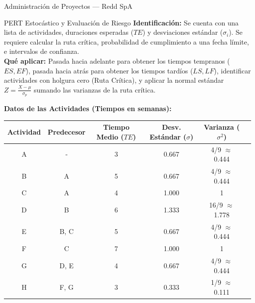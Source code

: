 \documentclass[11pt, a4paper]{article}
\begin{document}
\begin{ejercicio}{Administración de Proyectos --- Redd SpA}
  \begin{tipprueba}{PERT Estocástico y Evaluación de Riesgo}
    \textbf{Identificación:} Se cuenta con una lista de actividades, duraciones esperadas ($TE$) y desviaciones estándar ($\sigma_i$). Se requiere calcular la ruta crítica, probabilidad de cumplimiento a una fecha límite, e intervalos de confianza. \\
    \textbf{Qué aplicar:} Pasada hacia adelante para obtener los tiempos tempranos ($ES, EF$), pasada hacia atrás para obtener los tiempos tardíos ($LS, LF$), identificar actividades con holgura cero (Ruta Crítica), y aplicar la normal estándar $Z = \frac{X - \mu}{\sigma_p}$ sumando las varianzas de la ruta crítica.
  \end{tipprueba}

  \textbf{Datos de las Actividades (Tiempos en semanas):}
  \begin{center}
    \small
    \begin{tabular}{cccccc}
      \toprule
      Actividad & Predecesor & Tiempo Medio ($TE$) & Desv. Estándar ($\sigma$) & Varianza ($\sigma^2$) \\
      \midrule
      A & - & 3 & 0.667 & 4/9 $\approx$ 0.444 \\
      B & A & 5 & 0.667 & 4/9 $\approx$ 0.444 \\
      C & A & 4 & 1.000 & 1 \\
      D & B & 6 & 1.333 & 16/9 $\approx$ 1.778 \\
      E & B, C & 5 & 0.667 & 4/9 $\approx$ 0.444 \\
      F & C & 7 & 1.000 & 1 \\
      G & D, E & 4 & 0.667 & 4/9 $\approx$ 0.444 \\
      H & F, G & 3 & 0.333 & 1/9 $\approx$ 0.111 \\
      \bottomrule
    \end{tabular}
  \end{center}


\end{ejercicio}
\end{document}
